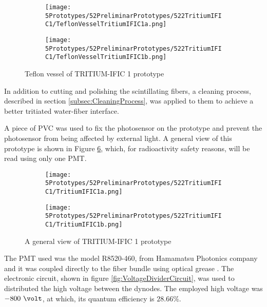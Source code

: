 \begin{figure}
\centering
    \begin{subfigure}[b]{0.30\textwidth}
    \centering
    \texttt{[image: 5Prototypes/52PreliminarPrototypes/522TritiumIFIC1/TeflonVesselTritiumIFIC1a.png]}  
    \caption{\label{subfig:TeflonVesselTritumIFIC1a}}
    \end{subfigure}
    \hfill
    \begin{subfigure}[b]{0.45\textwidth}
    \centering
    \texttt{[image: 5Prototypes/52PreliminarPrototypes/522TritiumIFIC1/TeflonVesselTritiumIFIC1b.png]}  
    \caption{\label{subfig:TeflonVesselTritumIFIC1b}}
    \end{subfigure}
 \caption{Teflon vessel of TRITIUM-IFIC 1 prototype}
 \label{fig:TeflonVesselTritumIFIC1}
\end{figure}

In addition to cutting and polishing the scintillating fibers, a cleaning process, described in section \ref{subsec:CleaningProcess}, was applied to them to achieve a better tritiated water-fiber interface.

A piece of PVC was used to fix the photosensor on the prototype and prevent the photosensor from being affected by external light. A general view of this prototype is shown in Figure \ref{fig:TritumIFIC1}, which, for radioactivity safety reasons, will be read using only one PMT.

\begin{figure}
\centering
    \begin{subfigure}[b]{0.40\textwidth}
    \centering
    \texttt{[image: 5Prototypes/52PreliminarPrototypes/522TritiumIFIC1/TritiumIFIC1a.png]}  
    \caption{\label{subfig:TritumIFIC1a}}
    \end{subfigure}
    \hfill
    \begin{subfigure}[b]{0.40\textwidth}
    \centering
    \texttt{[image: 5Prototypes/52PreliminarPrototypes/522TritiumIFIC1/TritiumIFIC1b.png]}  
    \caption{\label{subfig:TritumIFIC1b}}
    \end{subfigure}
 \caption{A general view of TRITIUM-IFIC 1 prototype}
 \label{fig:TritumIFIC1}
\end{figure}

The PMT used was the model R8520-460, from Hamamatsu Photonics company \cite{DataSheetPMTs} and it was coupled directly to the fiber bundle using optical grease \cite{OpticalGrease}. The electronic circuit, shown in figure \ref{fig:VoltageDividerCircuit}, was used to distributed the high voltage between the dynodes. The employed high voltage was $-800~\volt$, at which, its quantum efficiency is $28.66\%$.

